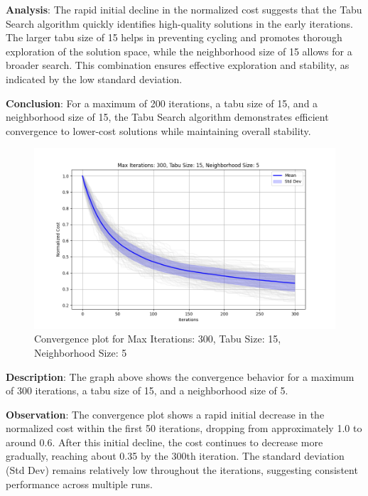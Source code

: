 \documentclass[
]{article}
\begin{document}
    \textbf{Analysis}: The rapid initial decline in the normalized cost suggests that the Tabu Search algorithm quickly identifies high-quality solutions in the early iterations. The larger tabu size of 15 helps in preventing cycling and promotes thorough exploration of the solution space, while the neighborhood size of 15 allows for a broader search. This combination ensures effective exploration and stability, as indicated by the low standard deviation.

    \textbf{Conclusion}: For a maximum of 200 iterations, a tabu size of 15, and a neighborhood size of 15, the Tabu Search algorithm demonstrates efficient convergence to lower-cost solutions while maintaining overall stability.

    \begin{figure}[H]
        \centering
        \includegraphics[width=\textwidth]{tabu_search/max_iter_300_tabu_size_15_neighborhood_size_5}
        \caption{Convergence plot for Max Iterations: 300, Tabu Size: 15, Neighborhood Size: 5}
        \label{fig:ts_300_15_5}
    \end{figure}

    \textbf{Description}: The graph above shows the convergence behavior for a maximum of 300 iterations, a tabu size of 15, and a neighborhood size of 5.

    \textbf{Observation}: The convergence plot shows a rapid initial decrease in the normalized cost within the first 50 iterations, dropping from approximately 1.0 to around 0.6. After this initial decline, the cost continues to decrease more gradually, reaching about 0.35 by the 300th iteration. The standard deviation (Std Dev) remains relatively low throughout the iterations, suggesting consistent performance across multiple runs.
\end{document}
